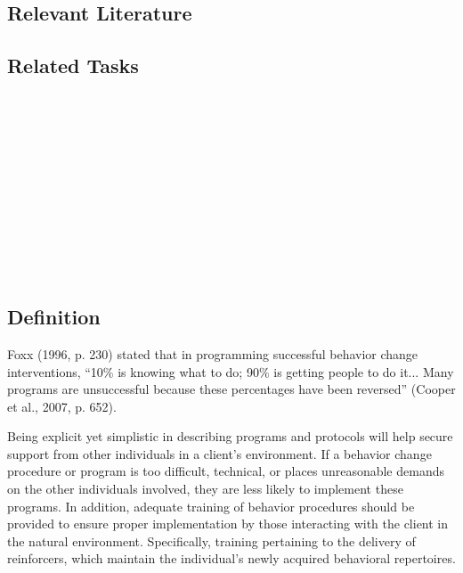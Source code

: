 \subsection{Relevant Literature}
\begin{refsection}
\nocite{cooper2007applied,
    malott2003principles,
    mazur2002learning}
\printbibliography[heading=none]
\end{refsection}
%
\subsection{Related Tasks}
\fouraOne{}\\
\fouraTwo{}\\
\fouraSeven{}\\
\fourdThree{}\\
\foureOne{}\\
\foureTwelve{}\\
\fourhOne{}\\
\fourFKTen{}\\
\fourFKEleven{}\\
\fourFKFourtySeven{}\\
%
\clearpage \section[\fourkNine{}]{\fourkNine{}%
              }
\subsection{Definition}
Foxx (1996, p. 230) stated that in programming successful behavior change interventions, ``10\% is knowing what to do; 90\% is getting people to do it... Many programs are unsuccessful because these percentages have been reversed'' (Cooper et al., 2007, p. 652). 

Being explicit yet simplistic in describing programs and protocols will help secure support from other individuals in a client's environment. If a behavior change procedure or program is too difficult, technical, or places unreasonable demands on the other individuals involved, they are less likely to implement these programs. In addition, adequate training of behavior procedures should be provided to ensure proper implementation by those interacting with the client in the natural environment. Specifically, training pertaining to the delivery of reinforcers, which maintain the individual's newly acquired behavioral repertoires.

